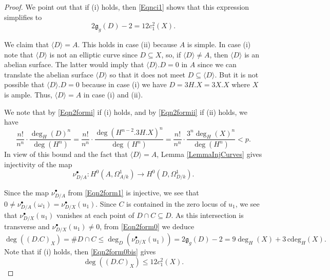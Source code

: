 \documentclass[11pt]{amsart}
\theoremstyle{remark}
\numberwithin{equation}{section}
\newcommand{\gfrak}{\mathfrak{g}}
\newcommand{\cdeg}{\,\mathrm{cdeg}}
\begin{document}
\begin{proof}
We point out that if (i) holds, then \eqref{Eqnci1}  shows that this expression simplifies to
\begin{equation}\label{Eqn2form0bis}
2\gfrak_g(D)-2 = 12c_1^2(X).
\end{equation}




We claim that $\langle D\rangle =A$. This holds in case (ii) because $A$ is simple. In case (i) note that $\langle D\rangle$ is not an elliptic curve since $D\subseteq X$, so, if $\langle D\rangle \ne A$, then $\langle D\rangle$ is an abelian surface. The latter would imply that $\langle D\rangle . D=0$ in $A$ since we can translate the abelian surface $\langle D\rangle$ so that it does not meet $D\subseteq\langle D\rangle$. But it is not possible that $\langle D\rangle . D=0$ because in case (i) we have $D=3H.X=3X.X$ where $X$ is ample. Thus, $\langle D\rangle =A$ in case (i) and (ii).

We note that by \eqref{Eqn2formi} if (i) holds, and by \eqref{Eqn2formii} if (ii) holds, we have
$$
\frac{n!}{n^n}\cdot \frac{\deg_H(D)^n}{\deg (H^n)}=\frac{n!}{n^n}\cdot \frac{\deg(H^{n-2}.3H.X)^n}{\deg (H^n)}=\frac{n! }{n^n}\cdot \frac{3^n\deg_H(X)^n}{\deg (H^n)}<p. 
$$
In view of this bound and the fact that $\langle D\rangle =A$, Lemma \ref{LemmaInjCurves} gives injectivity of the map 
\begin{equation}\label{Eqn2form1}
\nu_{D/A}^\bullet : H^0(A,\Omega^1_{A/k})\to H^0(D,\Omega^1_{D/k}).
\end{equation}








Since the map $\nu_{D/A}^\bullet$ from \eqref{Eqn2form1} is injective, we see that $0\ne \nu_{D/A}^\bullet(\omega_1) = \nu_{D/X}^\bullet(u_1)$. Since $C$ is contained in the zero locus of $u_1$, we see that $\nu_{D/X}^\bullet(u_1)$ vanishes at each point of $D\cap C\subseteq D$.  As this intersection is transverse and $\nu_{D/X}^\bullet(u_1)\ne 0$, from \eqref{Eqn2form0} we deduce
\begin{equation}\label{EqnBdInt1}
\deg((D.C)_X)=\# D\cap C\le \deg_D( \nu_{D/X}^\bullet(u_1))=2\gfrak_g(D)-2=9\deg_H(X) + 3\cdeg_H(X).
\end{equation}
Note that if (i) holds, then \eqref{Eqn2form0bis} gives
\begin{equation}\label{EqnBdInt2}
\deg((D.C)_X)\le 12 c_1^2(X).
\end{equation}







\end{proof}
\end{document}
